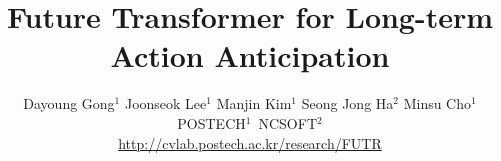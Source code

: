 \documentclass[10pt,twocolumn,letterpaper]{article}
\begin{document}
\title{Future Transformer for Long-term Action Anticipation}

\author{Dayoung Gong$^1$ \quad Joonseok Lee$^1$ \quad Manjin Kim$^1$ \quad Seong Jong Ha$^2$ \quad Minsu Cho$^1$\vspace{0.15cm}\\
\mbox{POSTECH$^1$ \quad \quad \quad NCSOFT$^2$}\\
{\small \url{http://cvlab.postech.ac.kr/research/FUTR}}
}


\maketitle








{\small


}
\clearpage

\end{document}
